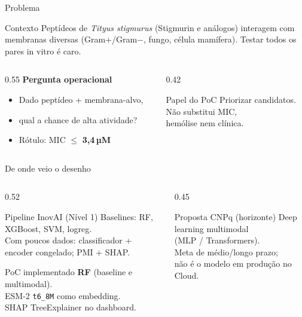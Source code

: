 \documentclass[aspectratio=169,10pt]{beamer}
\begin{document}
\begin{frame}{Problema}
\begin{block}{Contexto}
Peptídeos de \emph{Tityus stigmurus} (Stigmurin e análogos) interagem com membranas
diversas (Gram+/Gram$-$, fungo, célula mamífera). Testar todos os pares in vitro é caro.
\end{block}
\vspace{0.3cm}
\begin{columns}[T]
\begin{column}{0.55\textwidth}
\textbf{Pergunta operacional}\\[0.2cm]
\begin{itemize}
  \item Dado peptídeo + membrana-alvo,
  \item qual a chance de \alert{alta atividade}?
  \item Rótulo: MIC $\le$ \textbf{3,4\,µM}
\end{itemize}
\end{column}
\begin{column}{0.42\textwidth}
\begin{block}{Papel do PoC}
Priorizar candidatos.\\
Não substitui MIC,\\
hemólise nem clínica.
\end{block}
\end{column}
\end{columns}
\end{frame}

\begin{frame}{De onde veio o desenho}
\begin{columns}[T]
\begin{column}{0.52\textwidth}
\begin{block}{Pipeline InovAI (Nível 1)}
Baselines: RF, XGBoost, SVM, logreg.\\[0.15cm]
Com poucos dados: classificador +\\
encoder congelado; PMI + SHAP.
\end{block}
\vspace{0.25cm}
\begin{block}{PoC implementado}
\textbf{RF} (baseline e multimodal).\\
ESM-2 \texttt{t6\_8M} como embedding.\\
SHAP TreeExplainer no dashboard.
\end{block}
\end{column}
\begin{column}{0.45\textwidth}
\begin{block}{Proposta CNPq (horizonte)}
Deep learning multimodal\\
(MLP / Transformers).\\[0.15cm]
{\scriptsize Meta de médio/longo prazo;\\
não é o modelo em produção no Cloud.}
\end{block}
\end{column}
\end{columns}
\end{frame}
\end{document}
